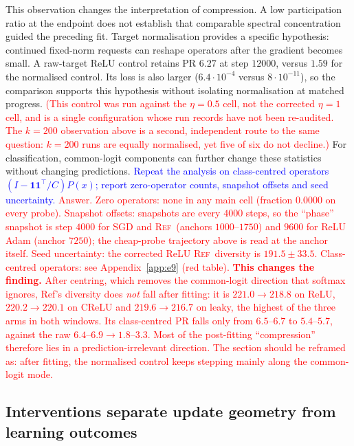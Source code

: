 \documentclass{article}
\newcommand{\zied}[1]{\textcolor{blue}{#1}}
\newcommand{\nat}[1]{\textcolor{red}{#1}}
\newcommand{\TOU}{\textsc{Ref}}
\theoremstyle{definition}
\theoremstyle{remark}
\begin{document}
This observation changes the interpretation of compression. A low participation ratio at the endpoint does not establish that comparable spectral concentration guided the preceding fit. Target normalisation provides a specific hypothesis: continued fixed-norm requests can reshape operators after the gradient becomes small. A raw-target ReLU control retains PR $6.27$ at step $12000$, versus $1.59$ for the normalised control. Its loss is also larger ($6.4\cdot10^{-4}$ versus $8\cdot10^{-11}$), so the comparison supports this hypothesis without isolating normalisation at matched progress. \nat{(This control was run against the $\eta=0.5$ cell, not the corrected $\eta=1$ cell, and is a single configuration whose run records have not been re-audited. The $k=200$ observation above is a second, independent route to the same question: $k=200$ runs are equally normalised, yet five of six do not decline.)} For classification, common-logit components can further change these statistics without changing predictions. \zied{Repeat the analysis on class-centred operators $(I-\mathbf1\mathbf1^\top/C)P(x)$; report zero-operator counts, snapshot offsets and seed uncertainty.}
\nat{Answer. Zero operators: none in any main cell (fraction $0.0000$ on every probe). Snapshot offsets: snapshots are every $4000$ steps, so the ``phase'' snapshot is step $4000$ for SGD and \TOU\ (anchors $1000$--$1750$) and $9600$ for ReLU Adam (anchor $7250$); the cheap-probe trajectory above is read at the anchor itself. Seed uncertainty: the corrected ReLU \TOU\ diversity is $191.5\pm33.5$. Class-centred operators: see Appendix~\ref{app:e9} (red table). \textbf{This changes the finding.} After centring, which removes the common-logit direction that softmax ignores, Ref's diversity does \emph{not} fall after fitting: it is $221.0\to218.8$ on ReLU, $220.2\to220.1$ on CReLU and $219.6\to216.7$ on leaky, the highest of the three arms in both windows. Its class-centred PR falls only from $6.5$--$6.7$ to $5.4$--$5.7$, against the raw $6.4$--$6.9\to1.8$--$3.3$. Most of the post-fitting ``compression'' therefore lies in a prediction-irrelevant direction. The section should be reframed as: after fitting, the normalised control keeps stepping mainly along the common-logit mode.}

\subsection{Interventions separate update geometry from learning outcomes}
\end{document}
